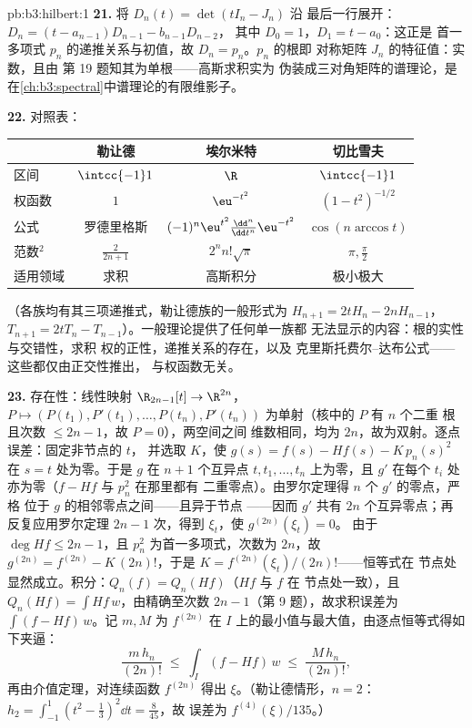\begin{solution}{pb:b3:hilbert:1}
\textbf{21.} 将 $D_n(t) = \det(tI_n - J_n)$ 沿
最后一行展开：$D_n = (t - a_{n-1})D_{n-1} - b_{n-1}D_{n-2}$，
其中 $D_0 = 1$，$D_1 = t - a_0$：这正是
首一多项式 $p_n$ 的递推关系与初值，故 $D_n = p_n$。$p_n$ 的根即
对称矩阵 $J_n$ 的特征值：实数，且由
第 19 题知其为单根——高斯求积实为
伪装成三对角矩阵的谱理论，是
在\cref{ch:b3:spectral}中谱理论的有限维影子。

\textbf{22.} 对照表：
\begin{center}
\begin{tabular}{l|c|c|c}
 & 勒让德 & 埃尔米特 & 切比雪夫 \\
\hline
区间 & $\intcc{-1}1$ & $\R$ & $\intcc{-1}1$\\
权函数 & $1$ & $\eu^{-t^2}$ & $(1-t^2)^{-1/2}$\\
公式 & 罗德里格斯 & $(-1)^n\eu^{t^2}
\frac{\dd^n}{\dd t^n}\eu^{-t^2}$ & $\cos(n\arccos t)$\\
范数$^2$ & $\frac2{2n+1}$ & $2^nn!\sqrt\pi$ & $\pi,
\frac\pi2$\\
适用领域 & 求积 & 高斯积分 & 极小极大 \\
\end{tabular}
\end{center}
（各族均有其三项递推式，勒让德族的一般形式为
$H_{n+1} = 2tH_n - 2nH_{n-1}$，$T_{n+1} = 2tT_n -
T_{n-1}$）。一般理论提供了任何单一族都
无法显示的内容：根的实性与交错性，求积
权的正性，递推关系的存在，以及
克里斯托费尔--达布公式——这些都仅由正交性推出，
与权函数无关。

\textbf{23.} 存在性：线性映射 $\R_{2n-1}[t] \to
\R^{2n}$，$P \mapsto (P(t_1), P'(t_1), \dots, P(t_n),
P'(t_n))$ 为单射（核中的 $P$ 有 $n$ 个二重
根且次数 $\leq 2n - 1$，故 $P = 0$），两空间之间
维数相同，均为 $2n$，故为双射。逐点误差：固定非节点的 $t$，
并选取 $K$，使 $g(s) = f(s) - Hf(s) -
K\,p_n(s)^2$ 在 $s = t$ 处为零。于是 $g$ 在
$n + 1$ 个互异点 $t, t_1, \dots, t_n$ 上为零，且 $g'$
在每个 $t_i$ 处亦为零（$f - Hf$ 与 $p_n^2$ 在那里都有
二重零点）。由罗尔定理得 $n$ 个 $g'$ 的零点，严格
位于 $g$ 的相邻零点之间——且异于节点
——因而 $g'$ 共有 $2n$ 个互异零点；再反复应用罗尔定理 $2n - 1$
次，得到 $\xi_t$，使 $g^{(2n)}(\xi_t) = 0$。
由于 $\deg Hf \leq 2n - 1$，且 $p_n^2$ 为首一多项式，次数为
$2n$，故 $g^{(2n)} = f^{(2n)} - K\,(2n)!$，于是 $K =
f^{(2n)}(\xi_t)/(2n)!$——恒等式在
节点处显然成立。积分：$Q_n(f) = Q_n(Hf)$（$Hf$ 与 $f$ 在
节点处一致），且 $Q_n(Hf) = \int Hf\,w$，由精确至次数
$2n - 1$（第 9 题），故求积误差为
$\int(f - Hf)\,w$。记 $m, M$ 为 $f^{(2n)}$ 在
$I$ 上的最小值与最大值，由逐点恒等式得如下夹逼：
\[
\frac{m\,h_n}{(2n)!} \;\leq\; \int_I(f - Hf)\,w
\;\leq\; \frac{M\,h_n}{(2n)!} ,
\]
再由介值定理，对连续函数
$f^{(2n)}$ 得出 $\xi$。（勒让德情形，$n = 2$：$h_2
= \int_{-1}^1(t^2 - \frac13)^2\dd t = \frac8{45}$，故
误差为 $f^{(4)}(\xi)/135$。）


\end{solution}
